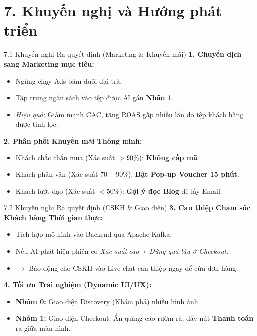 \documentclass[aspectratio=169, 11pt]{beamer}
\begin{document}
\section{7. Khuyến nghị và Hướng phát triển}

\begin{frame}{7.1 Khuyến nghị Ra quyết định (Marketing \& Khuyến mãi)}
    \textbf{1. Chuyển dịch sang Marketing mục tiêu:}
    \begin{itemize}
        \item Ngừng chạy Ads bám đuôi đại trà. 
        \item Tập trung ngân sách vào tệp được AI gán \textbf{Nhãn 1}.
        \item \textit{Hiệu quả:} Giảm mạnh CAC, tăng ROAS gấp nhiều lần do tệp khách hàng được tinh lọc.
    \end{itemize}

    \vspace{0.4cm}
    \textbf{2. Phân phối Khuyến mãi Thông minh:}
    \begin{itemize}
        \item Khách chắc chắn mua (Xác suất $>90\%$): \textbf{Không cấp mã}.
        \item Khách phân vân (Xác suất $70-90\%$): \textbf{Bật Pop-up Voucher 15 phút}.
        \item Khách lướt dạo (Xác suất $<50\%$): \textbf{Gợi ý đọc Blog} để lấy Email.
    \end{itemize}
\end{frame}

\begin{frame}{7.2 Khuyến nghị Ra quyết định (CSKH \& Giao diện)}
    \textbf{3. Can thiệp Chăm sóc Khách hàng Thời gian thực:}
    \begin{itemize}
        \item Tích hợp mô hình vào Backend qua Apache Kafka.
        \item Nếu AI phát hiện phiên có \textit{Xác suất cao + Dừng quá lâu ở Checkout}.
        \item $\rightarrow$ Báo động cho CSKH vào Live-chat can thiệp ngay để cứu đơn hàng.
    \end{itemize}

    \vspace{0.4cm}
    \textbf{4. Tối ưu Trải nghiệm (Dynamic UI/UX):}
    \begin{itemize}
        \item \textbf{Nhóm 0:} Giao diện Discovery (Khám phá) nhiều hình ảnh.
        \item \textbf{Nhóm 1:} Giao diện Checkout. Ẩn quảng cáo rườm rà, đẩy nút \textbf{Thanh toán} ra giữa màn hình.
    \end{itemize}
\end{frame}
\end{document}
